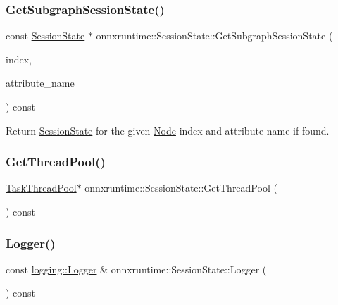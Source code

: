 \subsubsection{\texorpdfstring{Get\+Subgraph\+Session\+State()}{GetSubgraphSessionState()}}
{\footnotesize\ttfamily const \mbox{\hyperlink{classonnxruntime_1_1SessionState}{Session\+State}} $\ast$ onnxruntime\+::\+Session\+State\+::\+Get\+Subgraph\+Session\+State (\begin{DoxyParamCaption}\item[{\mbox{\hyperlink{namespaceonnxruntime_af8773b5c12b5d8fd9292eb2e268df760}{onnxruntime\+::\+Node\+Index}}}]{index,  }\item[{const std\+::string \&}]{attribute\+\_\+name }\end{DoxyParamCaption}) const}



Return \mbox{\hyperlink{classonnxruntime_1_1SessionState}{Session\+State}} for the given \mbox{\hyperlink{classonnxruntime_1_1Node}{Node}} index and attribute name if found. 

\mbox{\label{classonnxruntime_1_1SessionState_a756fc2e2e8e3a50af56697a431b8869b}} 
\subsubsection{\texorpdfstring{Get\+Thread\+Pool()}{GetThreadPool()}}
{\footnotesize\ttfamily \mbox{\hyperlink{classonnxruntime_1_1TaskThreadPool}{Task\+Thread\+Pool}}$\ast$ onnxruntime\+::\+Session\+State\+::\+Get\+Thread\+Pool (\begin{DoxyParamCaption}{ }\end{DoxyParamCaption}) const\hspace{0.3cm}{\ttfamily [inline]}}

\mbox{\label{classonnxruntime_1_1SessionState_af88e64c9cb77a0015935769ff1ec80c2}} 
\subsubsection{\texorpdfstring{Logger()}{Logger()}}
{\footnotesize\ttfamily const \mbox{\hyperlink{classonnxruntime_1_1logging_1_1Logger}{logging\+::\+Logger}} \& onnxruntime\+::\+Session\+State\+::\+Logger (\begin{DoxyParamCaption}{ }\end{DoxyParamCaption}) const}

